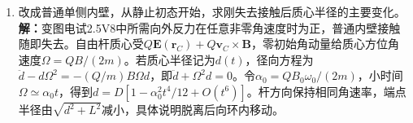\documentclass[UTF8,fontset=fandol,a4paper,11pt]{ctexart}
\begin{document}
\begin{enumerate}
\item 改成普通单侧内壁，从静止初态开始，求刚失去接触后质心半径的主要变化。
\textbf{解：}变图电试2.5V8中所需向外反力在任意非零角速度时为正，普通内壁接触随即失去。自由杆质心受$Q\boldsymbol E(\boldsymbol r_C)+Q\boldsymbol v_C\times\boldsymbol B$，零初始角动量给质心方位角速度$\Omega=QB/(2m)$。若质心半径记为$d(t)$，径向方程为$\ddot d-d\Omega^2=-(Q/m)B\Omega d$，即$\ddot d+\Omega^2d=0$。令$\alpha_0=QB_0\omega_0/(2m)$，小时间$\Omega\simeq\alpha_0t$，得到$d=D[1-\alpha_0^2t^4/12+O(t^6)]$。杆方向保持相同角速率，端点半径由$\sqrt{d^2+L^2}$减小，具体说明脱离后向环内移动。
\begin{center}\begin{minipage}{.98\linewidth}\centering
{}
\end{minipage}
\end{center}
\end{enumerate}
\end{document}
